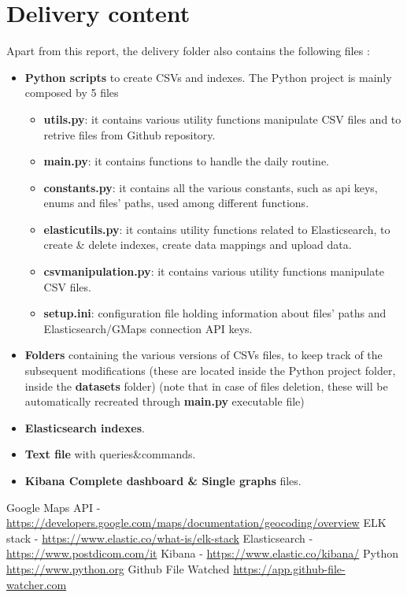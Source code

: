 \documentclass{article}[IEEEtran]
\begin{document}
\appendix
\section{Delivery content}
Apart from this report, the delivery folder also contains the following files :
\begin{itemize}
    \item \textbf{Python scripts} to create CSVs and indexes. The Python project is mainly composed by 5 files
    \begin{itemize}
        \item \textbf{utils.py}: it contains various utility functions manipulate CSV files and to retrive files from Github repository.
        \item \textbf{main.py}: it contains functions to handle the daily routine.
        \item \textbf{constants.py}: it contains all the various constants, such as api keys, enums and files' paths, used among different functions.
        \item \textbf{elasticutils.py}: it contains utility functions related to Elasticsearch, to create \& delete indexes, create data mappings and upload data.
        \item \textbf{csvmanipulation.py}:  it contains various utility functions manipulate CSV files.
        \item \textbf{setup.ini}: configuration file holding information about files' paths and Elasticsearch/GMaps connection API keys. 
        
    \end{itemize}
    \item \textbf{Folders} containing the various versions of CSVs files, to keep track of the subsequent modifications (these are located inside the Python project folder, inside the \textbf{datasets} folder) (note that in case of files deletion, these will be automatically recreated through \textbf{main.py} executable file)
    \item \textbf{Elasticsearch indexes}.
    \item \textbf{Text file} with queries\&commands.
    \item \textbf{Kibana Complete dashboard \& Single graphs} files.
\end{itemize}


\begin{thebibliography}{00}

Google Maps API - \url{https://developers.google.com/maps/documentation/geocoding/overview}
ELK stack - \url{https://www.elastic.co/what-is/elk-stack}
Elasticsearch - \url{https://www.postdicom.com/it}
Kibana - \url{https://www.elastic.co/kibana/}
Python \url{https://www.python.org}
Github File Watched \url{https://app.github-file-watcher.com}

\end{thebibliography}
\end{document}

